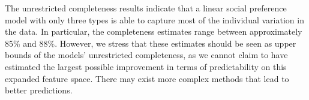 \documentclass[11pt,a4paper]{article}
\theoremstyle{definition}
\begin{document}
The unrestricted completeness results indicate that a linear social preference model with only three types is able to capture most of the individual variation in the data. In particular, the completeness estimates range between approximately 85\% and 88\%. However, we stress that these estimates should be seen as upper bounds of the models' unrestricted completeness, as we cannot claim to have estimated the largest possible improvement in terms of predictability on this expanded feature space. There may exist more complex methods that lead to better predictions.

\end{document}
